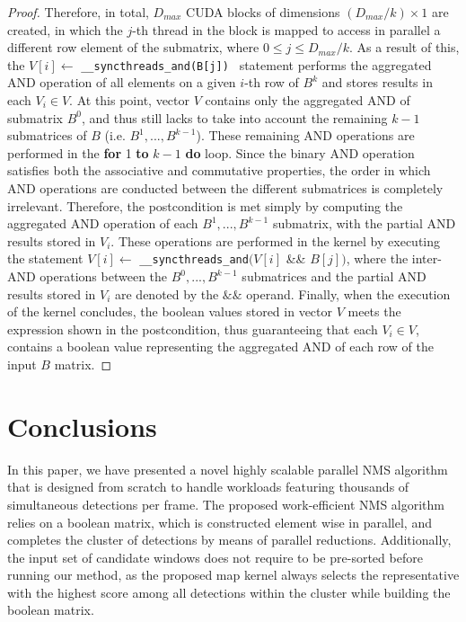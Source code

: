 \begin{proof}
\noindent Therefore, in total, $D_{max}$ CUDA blocks of dimensions $(D_{max} / k) \times 1$ are created, in which 
the $j$-th thread in the block is mapped to access in parallel a different row element of the submatrix, 
where $0 \leq j \leq D_{max} / k$. As a result of this, the $V[i] \leftarrow $ \footnotesize\texttt{\_\_syncthreads\_and(B[j]) }\normalsize 
statement performs the aggregated AND operation of all elements on a given $i$-th row of $B^k$ and stores results 
in each $V_i \in V$. At this point, vector $V$ contains only the aggregated AND of submatrix $B^0$, and thus still lacks to 
take into account the remaining $k-1$ submatrices of $B$ (i.e. $B^1,...,B^{k-1}$). These remaining AND operations are 
performed in the \textbf{for} 1 \textbf{to} $k-1$ \textbf{do} loop. Since the binary AND operation satisfies both the associative 
and commutative properties, the order in which AND operations are conducted between the different submatrices is completely 
irrelevant. Therefore, the postcondition is met simply by computing the aggregated AND operation of each $B^1, ..., B^{k-1}$ submatrix, 
with the partial AND results stored in $V_{i}$. These operations are performed in the kernel by executing the statement  
$V[i] \leftarrow $ \footnotesize\texttt{\_\_syncthreads\_and}\normalsize$(V[i]$ \&\& $B[j])$, where the inter-AND operations between 
the $B^0, ..., B^{k-1}$ submatrices and the partial AND results stored in $V_i$ are denoted by the $\&\&$ operand. Finally, 
when the execution of the kernel concludes, the boolean values stored in vector $V$ meets the expression shown in the postcondition, thus 
guaranteeing that each $V_i \in V$, contains a boolean value representing the aggregated AND of each row of the input $B$ matrix.
\end{proof}


\section{Conclusions}

In this paper, we have presented a novel highly scalable parallel NMS algorithm that is designed from scratch to handle 
workloads featuring thousands of simultaneous detections per frame. The proposed work-efficient NMS algorithm relies on a boolean 
matrix, which is constructed element wise in parallel, and completes the cluster of detections by means of parallel reductions. 
Additionally, the input set of candidate windows does not require to be pre-sorted before running our method, as the proposed 
map kernel always selects the representative with the highest score among all detections within the cluster while 
building the boolean matrix.

